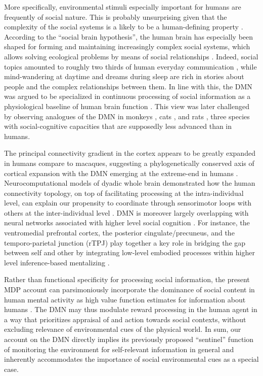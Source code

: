 \documentclass[10pt,letterpaper]{article}
\newcommand{\suggestadd}[1]{{\color{blue} #1}}
\begin{document}
More specifically,
environmental stimuli especially important for humans are frequently of
social nature. This is probably unsurprising
given that
the complexity of the social systems
is a likely to be a human-defining property
\citep{tomasello2009cultural}.
According to the ``social brain hypothesis'',
the human brain has especially been shaped for
forming and maintaining increasingly complex
social systems,
which allows solving ecological problems by means of social relationships
\citep{whiten1988machiavellian}.
Indeed, social topics amounted to roughly
two thirds of human everyday communication \citep{dunbar1997human},
while
mind-wandering at daytime and dreams during sleep
are rich in stories about people and
the complex relationships between them.
%
In line with this, the DMN was argued to be specialized in
continuous processing of social information as a
physiological baseline of human brain function
\citep{schilbach2008minds}. This view was later challenged by observing
analogues of the DMN in monkeys \citep{mantini2011default},
cats \citep{popa2009contrasting},
and rats \citep{lu2012rat}, three species with
social-cognitive capacities that are supposedly less advanced than in humans.

\suggestadd{The principal connectivity gradient in the cortex appears to be greatly expanded in humans compare to macaques, suggesting a phylogenetically conserved axis of cortical expansion with the DMN emerging at the extreme-end in humans \citep{margulies_situating_2016}. Neurocomputational models of dyadic whole brain demonstrated how the human connectivity topology, on top of facilitating processing at the intra-individual level, can explain our propensity to coordinate through sensorimotor loops with others at the inter-individual level \citep{dumas_anatomical_2012}. DMN is moreover largely overlapping with neural networks associated with higher level social cognition \citep{schilbach_introspective_2012}. For instance, the ventromedial prefrontal cortex, the posterior cingulate/precuneus, and the temporo-parietal junction (rTPJ) play together a key role in bridging the gap between self and other by
integrating low-level embodied processes within higher level inference-based mentalizing \citep{lombardo_shared_2009}.}

Rather than functional specificity for processing social information,
the present MDP account can parsimoniously incorporate
the dominance of social content in
human mental activity
as high value function estimates for information about humans
\citep{baker2009action, kampe2001psychology, krienen2010clan}.
The DMN may thus modulate reward processing
in the human agent in a way that prioritizes
appraisal of and action towards social contexts,
without excluding relevance of environmental cues of the physical world.
In sum,
our account on the DMN directly implies
its previously proposed ``sentinel'' function
of monitoring the environment for self-relevant information
in general and
inherently accommodates the importance of social environmental cues
as a special case.
\end{document}
